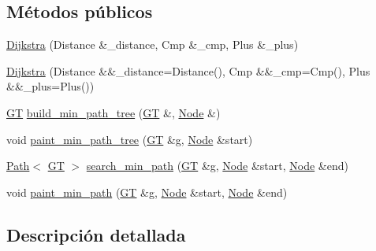 \subsection*{Métodos públicos}
\begin{DoxyCompactItemize}
\item 
\hyperlink{class_designar_1_1_dijkstra_ada4a9a8403304341114425e296c5ed26}{Dijkstra} (Distance \&\+\_\+distance, Cmp \&\+\_\+cmp, Plus \&\+\_\+plus)
\item 
\hyperlink{class_designar_1_1_dijkstra_a26f374b129c8108d6b95fc57f8dc09df}{Dijkstra} (Distance \&\&\+\_\+distance=Distance(), Cmp \&\&\+\_\+cmp=Cmp(), Plus \&\&\+\_\+plus=Plus())
\item 
\hyperlink{demo-buildgraph_8_c_a3001c40d2c31ca87ed96cd7d1334a55e}{GT} \hyperlink{class_designar_1_1_dijkstra_a70bbeb5dcd70c6ff3d203b7772021467}{build\+\_\+min\+\_\+path\+\_\+tree} (\hyperlink{demo-buildgraph_8_c_a3001c40d2c31ca87ed96cd7d1334a55e}{GT} \&, \hyperlink{class_designar_1_1_dijkstra_afeb644fc5395569ec366f0d220ab477d}{Node} \&)
\item 
void \hyperlink{class_designar_1_1_dijkstra_a607872c03f2e6de59936118e6f6c8790}{paint\+\_\+min\+\_\+path\+\_\+tree} (\hyperlink{demo-buildgraph_8_c_a3001c40d2c31ca87ed96cd7d1334a55e}{GT} \&g, \hyperlink{class_designar_1_1_dijkstra_afeb644fc5395569ec366f0d220ab477d}{Node} \&start)
\item 
\hyperlink{class_designar_1_1_path}{Path}$<$ \hyperlink{demo-buildgraph_8_c_a3001c40d2c31ca87ed96cd7d1334a55e}{GT} $>$ \hyperlink{class_designar_1_1_dijkstra_ab2d75c571dff03279bea0192047461f0}{search\+\_\+min\+\_\+path} (\hyperlink{demo-buildgraph_8_c_a3001c40d2c31ca87ed96cd7d1334a55e}{GT} \&g, \hyperlink{class_designar_1_1_dijkstra_afeb644fc5395569ec366f0d220ab477d}{Node} \&start, \hyperlink{class_designar_1_1_dijkstra_afeb644fc5395569ec366f0d220ab477d}{Node} \&end)
\item 
void \hyperlink{class_designar_1_1_dijkstra_a103839d3bd4e6d8733d2b47b186e137a}{paint\+\_\+min\+\_\+path} (\hyperlink{demo-buildgraph_8_c_a3001c40d2c31ca87ed96cd7d1334a55e}{GT} \&g, \hyperlink{class_designar_1_1_dijkstra_afeb644fc5395569ec366f0d220ab477d}{Node} \&start, \hyperlink{class_designar_1_1_dijkstra_afeb644fc5395569ec366f0d220ab477d}{Node} \&end)
\end{DoxyCompactItemize}


\subsection{Descripción detallada}
